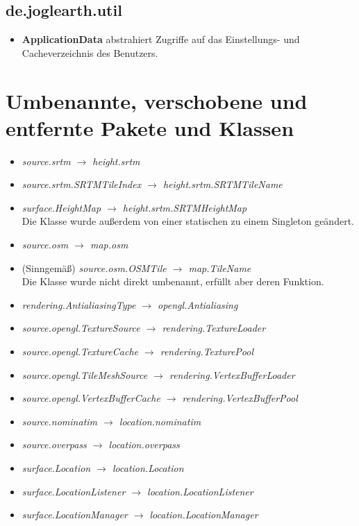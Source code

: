 \documentclass[10pt]{scrreprt}
\begin{document}
\subsection*{de.joglearth.util}
\begin{itemize}
\item \textbf{ApplicationData} abstrahiert Zugriffe auf das Einstellungs- und Cacheverzeichnis des Benutzers.
\end{itemize}


\section{Umbenannte, verschobene und entfernte Pakete und Klassen}
\begin{itemize}
\item \textit{source.srtm $\rightarrow$ height.srtm}
\item \textit{source.srtm.SRTMTileIndex $\rightarrow$ height.srtm.SRTMTileName}
\item \textit{surface.HeightMap $\rightarrow$ height.srtm.SRTMHeightMap}\\ Die Klasse wurde außerdem von einer statischen zu einem Singleton geändert.
\item \textit{source.osm $\rightarrow$ map.osm}
\item (Sinngemäß) \textit{source.osm.OSMTile $\rightarrow$ map.TileName}\\ Die Klasse wurde nicht direkt umbenannt, erfüllt aber deren Funktion.
\item \textit{rendering.AntialiasingType $\rightarrow$ opengl.Antialiasing}
\item \textit{source.opengl.TextureSource $\rightarrow$ rendering.TextureLoader}
\item \textit{source.opengl.TextureCache $\rightarrow$ rendering.TexturePool}
\item \textit{source.opengl.TileMeshSource $\rightarrow$ rendering.VertexBufferLoader}
\item \textit{source.opengl.VertexBufferCache $\rightarrow$ rendering.VertexBufferPool}
\item \textit{source.nominatim $\rightarrow$ location.nominatim}
\item \textit{source.overpass $\rightarrow$ location.overpass}
\item \textit{surface.Location $\rightarrow$ location.Location}
\item \textit{surface.LocationListener $\rightarrow$ location.LocationListener}
\item \textit{surface.LocationManager $\rightarrow$ location.LocationManager}

\end{itemize}
\end{document}
